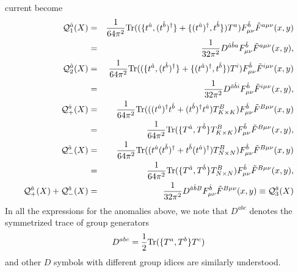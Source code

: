 \documentclass[a4paper,12pt]{article}
\begin{document}
current become 
\begin{eqnarray}
{\cal Q}^{\hat a}_1(X)&=&\frac{1}{64\pi^2}{\rm Tr}
((\{t^{\hat a},(t^{\hat b })^\dagger\}
+\{(t^{\hat a})^\dagger,t^{\hat b}\})T^a)
F^{\hat b}_{\mu\nu}{\tilde F}^{a\mu\nu}(x,y) \nonumber \\
&=&\frac{1}{32\pi^2}D^{{\hat a}{\hat b}a}
F^{\hat b}_{\mu\nu}{\tilde F}^{a\mu\nu}(x,y),\\
{\cal Q}^{\hat a}_2(X)&=&\frac{1}{64\pi^2}{\rm Tr}
((\{t^{\hat a},(t^{\hat b})^\dagger\}
+\{(t^{\hat a})^\dagger,t^{\hat b}\})T^i)
F^{\hat b}_{\mu\nu}{\tilde F}^{i\mu\nu}(x,y)  \nonumber \\
&=&\frac{1}{32\pi^2}D^{{\hat a}{\hat b}i}
F^{\hat b}_{\mu\nu}{\tilde F}^{i\mu\nu}(x,y),\\
{\cal Q}^{\hat a}_+(X)&=&\frac{1}{64\pi^2}{\rm Tr}
(((t^{\hat a})^\dagger t^{\hat b}+(t^{\hat b })^\dagger t^{\hat a})
T^B_{K\times K})F^{\hat b}_{\mu\nu}{\tilde F}^{B\mu\nu}(x,y) \nonumber \\
&=&\frac{1}{64\pi^2}{\rm Tr} (\{T^{\hat a},T^{\hat b}\}T^B_{K\times K})
F^{\hat b}_{\mu\nu}{\tilde F}^{B\mu\nu}(x,y), \\
{\cal Q}^{\hat a}_-(X)&=&\frac{1}{64\pi^2}{\rm Tr}
((t^{\hat a} (t^{\hat b})^\dagger+t^{\hat b} (t^{\hat a})^\dagger)
T^B_{N\times N})F^{\hat b}_{\mu\nu}{\tilde F}^{B\mu\nu}(x,y) \nonumber\\ 
&=&\frac{1}{64\pi^2}{\rm Tr} (\{T^{\hat a},T^{\hat b}\}T^B_{N\times N})
F^{\hat b}_{\mu\nu}{\tilde F}^{B\mu\nu}(x,y), \\
{\cal Q}^{\hat a}_+(X)+{\cal Q}^{\hat a}_-(X)&=&
\frac{1}{32\pi^2}D^{{\hat a}{\hat b}B}F^{\hat b}_{\mu\nu}
{\tilde F}^{B\mu\nu}(x,y) \equiv {\cal Q}^{\hat a}_3(X)
\end{eqnarray}
In all the expressions for the anomalies above,  
we note that $D^{abc}$ denotes the symmetrized trace of group generators
\begin{eqnarray}
D^{abc}=\frac{1}{2}{\rm Tr}(\{T^a,T^b\}T^c)
\end{eqnarray} 
and other $D$ symbols with different group idices are similarly understood. 
\end{document}
